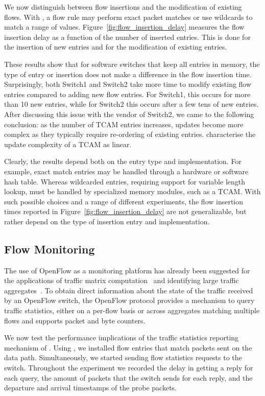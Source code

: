 We now distinguish between flow insertions and the modification of existing
flows.  With \of, a flow rule may perform exact packet matches or use
wildcards to match a range of values. Figure~\ref{fig:flow_insertion_delay}
measures the flow insertion delay as a function of the number of inserted
entries. This is done for the insertion of new entries and for the modification
of existing entries.

These results show that for software switches that keep all entries in memory,
the type of entry or insertion does not make a difference in the flow insertion
time.  Surprisingly, both Switch1 and Switch2 take more time to modify existing
flow entries compared to adding new flow entries.  For Switch1, this occurs for
more than 10 new entries, while for Switch2 this occurs after a few tens of new
entries.  After discussing this issue with the vendor of Switch2, we came to the
following conclusion: as the number of TCAM entries increases, updates become
more complex as they typically require re-ordering of existing entries.
 characterise the update complexity of a TCAM as linear.

Clearly, the results depend both on the entry type and implementation.  For
example, exact match entries may be handled through a hardware or software hash
table. Whereas wildcarded entries, requiring support for variable length
lookup, must be handled by specialized memory modules, such as a TCAM\@. With such
possible choices and a range of different experiments, the flow insertion times
reported in Figure~\ref{fig:flow_insertion_delay} are not generalizable, but
rather depend on the type of insertion entry and implementation.

\subsection{Flow Monitoring}\label{sec:results-monitoring}

The use of OpenFlow as a monitoring platform has already been suggested for the
applications of traffic matrix computation~ and
identifying large traffic aggregates~. To
obtain direct information about the state of the traffic received by an OpenFlow
switch, the OpenFlow protocol provides a mechanism to query traffic statistics,
either on a per-flow basis or across aggregates matching multiple flows and
supports packet and byte counters. 

We now test the performance implications of the traffic statistics reporting
mechanism of \of. Using \oflops, we installed flow entries that match packets sent
on the data path. Simultaneously, we started sending flow statistics requests to
the switch. Throughout the experiment we recorded the delay in getting a reply for
each query, the amount of packets that the switch sends for each reply, and the
departure and arrival timestamps of the probe packets.

